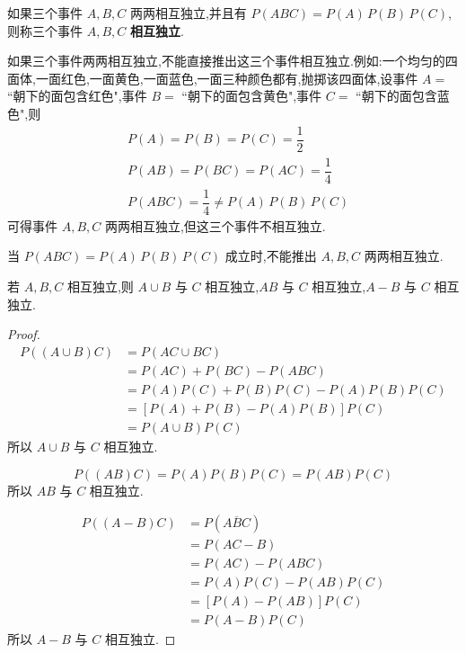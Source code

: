 \begin{definition}
    \indent 如果三个事件 $A,B,C$ 两两相互独立,并且有 $P(ABC)=P(A)\,P(B)\,P(C)$,则称三个事件 $A,B,C$ \textbf{相互独立}.
\end{definition}

\begin{note}
    \indent 如果三个事件两两相互独立,不能直接推出这三个事件相互独立.例如:一个均匀的四面体,一面红色,一面黄色,一面蓝色,一面三种颜色都有,抛掷该四面体,设事件 $A=$ ``朝下的面包含红色",事件 $B=$ ``朝下的面包含黄色",事件 $C=$ ``朝下的面包含蓝色",则
    $$
    \begin{aligned}
        & P(A) = P(B) = P(C) = \dfrac{1}{2} \\
        & P(AB) = P(BC) = P(AC) = \dfrac{1}{4} \\
        & P(ABC) = \dfrac{1}{4} \not= P(A) \, P(B) \, P(C)
    \end{aligned}
    $$
    可得事件 $A,B,C$ 两两相互独立,但这三个事件不相互独立.

    当 $P(ABC)=P(A)\,P(B)\,P(C)$ 成立时,不能推出 $A,B,C$ 两两相互独立.
\end{note}

\begin{conclusion}
    \indent 若 $A,B,C$ 相互独立,则 $A \cup B$ 与 $C$ 相互独立,$AB$ 与 $C$ 相互独立,$A-B$ 与 $C$ 相互独立.
\end{conclusion}

\begin{proof}
    $$
    \begin{aligned}
        P((A \cup B) C) &= P(AC \cup BC) \\
        &= P(AC) + P(BC) - P(ABC) \\
        &= P(A) P(C) + P(B) P(C) - P(A) P(B) P(C) \\
        &= [P(A) + P(B) - P(A) P(B)] P(C) \\
        &= P(A \cup B) P(C)
    \end{aligned}
    $$
    所以 $A \cup B$ 与 $C$ 相互独立.

    $$
    P((AB)C) = P(A) P(B) P(C) = P(AB) P(C)
    $$
    所以 $AB$ 与 $C$ 相互独立.

    $$
    \begin{aligned}
        P((A-B)C) &= P(A \overline{B} C) \\
        &= P(AC-B) \\
        &= P(AC) - P(ABC) \\
        &= P(A) P(C) - P(AB) P(C) \\
        &= [P(A) - P(AB)] P(C) \\
        &= P(A-B) P(C)
    \end{aligned}
    $$
    所以 $A-B$ 与 $C$ 相互独立.
\end{proof}

